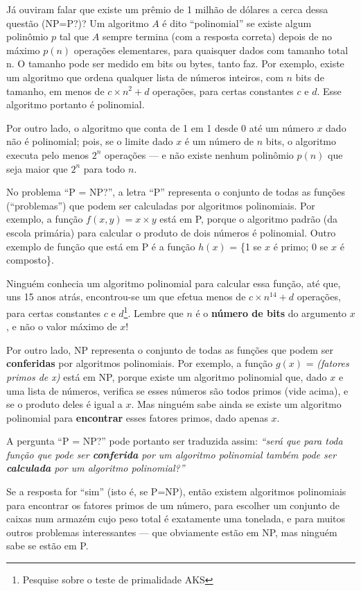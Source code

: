 Já ouviram falar que existe um prêmio de 1 milhão de dólares a cerca dessa questão (NP=P?)?
Um algoritmo $A$ é dito ``polinomial'' se existe algum
polinômio $p$ tal que $A$ sempre termina (com a resposta correta)
depois de no máximo $p(n)$ operações elementares, para quaisquer dados
com tamanho total n.
O tamanho pode ser medido em bits ou bytes, tanto faz.
Por exemplo, existe um algoritmo que ordena qualquer lista de números
inteiros, com $n$ bits de tamanho, em menos de $c \times n^{2} + d$ operações, para
certas constantes $c$ e $d$.
Esse algoritmo portanto é polinomial.

Por outro lado, o algoritmo que conta de 1 em 1 desde 0 até um número
$x$ dado não é polinomial; pois, se o limite dado $x$ é um número de $n$
bits, o algoritmo executa pelo menos $2^n$ operações --- e não existe
nenhum polinômio $p(n)$ que seja maior que $2^n$ para todo $n$.

No problema ``P = NP?'', a letra ``P'' representa o conjunto de todas as
funções (``problemas'') que podem ser calculadas por algoritmos
polinomiais.
Por exemplo, a função $f(x,y) = x \times y$ está em P, porque o
algoritmo padrão (da escola primária) para calcular o produto de dois
números é polinomial.
Outro exemplo de função que está em P é a função $h(x)$ = \{1 se $x$ é
primo; $0$ se $x$ é composto\}.

Ninguém conhecia um algoritmo polinomial para calcular essa função, até que,
uns 15 anos atrás, encontrou-se um que efetua menos
de $c \times n^{14} + d$ operações, para certas
constantes $c$ e $d$\footnote{Pesquise sobre o teste de primalidade AKS}.
Lembre que $n$ é o \textbf{número de bits} do argumento $x$, e não o valor
máximo de $x$!

Por outro lado, NP representa o conjunto de todas as funções que podem
ser \textbf{conferidas} por algoritmos polinomiais.
Por exemplo, a função $g(x)$ = \textit{(fatores primos de x)} está em NP,
porque existe um algoritmo polinomial que, dado $x$ e uma lista de números,
verifica se esses números são todos primos (vide acima), e se o produto deles
é igual a $x$.
Mas ninguém sabe ainda se existe um algoritmo polinomial para
\textbf{encontrar} esses fatores primos, dado apenas $x$.

A pergunta ``P = NP?'' pode portanto ser traduzida assim:
  \textit{``será que para toda função que pode ser \textbf{conferida} por um
  algoritmo polinomial também pode ser \textbf{calculada} por um
  algoritmo polinomial?''}

Se a resposta for ``sim'' (isto é, se P=NP), então existem algoritmos
polinomiais para encontrar os fatores primos de um número, para
escolher um conjunto de caixas num armazém cujo peso total é
exatamente uma tonelada, e para muitos outros problemas interessantes
--- que obviamente estão em NP, mas ninguém sabe se estão em P.

